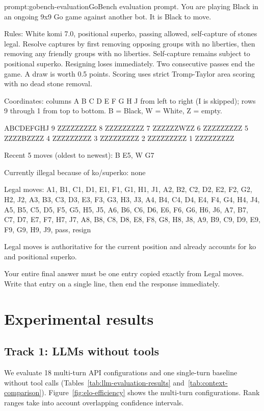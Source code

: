 \documentclass{article}
\begin{document}
\begin{verbatimblock}{prompt:gobench-evaluation}{GoBench evaluation prompt.}
You are playing Black in an ongoing 9x9 Go game against another bot. It is Black to move.

Rules: White komi 7.0, positional superko, passing allowed, self-capture of stones legal. Resolve captures by first removing opposing groups with no liberties, then removing any friendly groups with no liberties. Self-capture remains subject to positional superko. Resigning loses immediately. Two consecutive passes end the game. A draw is worth 0.5 points. Scoring uses strict Tromp-Taylor area scoring with no dead stone removal.

Coordinates: columns A B C D E F G H J from left to right (I is skipped); rows 9 through 1 from top to bottom. B = Black, W = White, Z = empty.

ABCDEFGHJ
9 ZZZZZZZZZ
8 ZZZZZZZZZ
7 ZZZZZZWZZ
6 ZZZZZZZZZ
5 ZZZZBZZZZ
4 ZZZZZZZZZ
3 ZZZZZZZZZ
2 ZZZZZZZZZ
1 ZZZZZZZZZ

Recent 5 moves (oldest to newest): B E5, W G7

Currently illegal because of ko/superko: none

Legal moves: A1, B1, C1, D1, E1, F1, G1, H1, J1, A2, B2, C2, D2, E2, F2, G2, H2, J2, A3, B3, C3, D3, E3, F3, G3, H3, J3, A4, B4, C4, D4, E4, F4, G4, H4, J4, A5, B5, C5, D5, F5, G5, H5, J5, A6, B6, C6, D6, E6, F6, G6, H6, J6, A7, B7, C7, D7, E7, F7, H7, J7, A8, B8, C8, D8, E8, F8, G8, H8, J8, A9, B9, C9, D9, E9, F9, G9, H9, J9, pass, resign

Legal moves is authoritative for the current position and already accounts for ko and positional superko.

Your entire final answer must be one entry copied exactly from Legal moves.
Write that entry on a single line, then end the response immediately.
\end{verbatimblock}

\section{Experimental results}
\label{sec:evaluation}

\subsection{Track 1: LLMs without tools}
We evaluate 18 multi-turn API configurations and one single-turn baseline
without tool calls (Tables~\ref{tab:llm-evaluation-results} and~\ref{tab:context-comparison}). Figure~\ref{fig:elo-efficiency}
shows the multi-turn configurations.
Rank ranges take into account overlapping confidence intervals.
\end{document}
